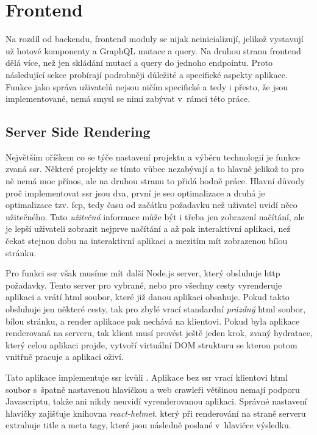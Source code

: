 \section{Frontend}
\label{sc:frontend}
Na rozdíl od backendu, frontend moduly se nijak neinicializují, jelikož vystavují už hotové komponenty a GraphQL mutace a query. Na druhou stranu frontend dělá více, než jen skládání mutací a query do jednoho endpointu. Proto následující sekce probírají podrobněji důležité a specifické aspekty aplikace. Funkce jako správa uživatelů nejsou ničím specifické a tedy i přesto, že jsou implementované, nemá smysl se nimi zabývat v~rámci této práce.

\subsection{Server Side Rendering}
\label{ss:ssr}
Největším oříškem co se týče nastavení projektu a výběru technologií je funkce zvaná \acrfull{ssr}. Některé projekty se tímto vůbec nezabývají a to hlavně jelikož to pro ně nemá moc přínos, ale na druhou stranu to přidá hodně práce. Hlavní důvody proč implementovat \acrshort{ssr} jsou dva, první je \acrshort{seo} optimalizace a druhá je optimalizace tzv. \acrfull{fcp}, tedy času od začátku požadavku než uživatel uvidí něco užitečného. Tato \emph{užitečná} informace může být i třeba jen zobrazení načítání, ale je lepší uživateli zobrazit nejprve načítání a až pak interaktivní aplikaci, než čekat stejnou dobu na interaktivní aplikaci a mezitím mít zobrazenou bílou stránku.

Pro funkci \acrshort{ssr} však musíme mít další Node.js server, který obsluhuje http požadavky. Tento server pro vybrané, nebo pro všechny cesty vyrenderuje aplikaci a vrátí html soubor, které již danou aplikaci obsahuje. Pokud takto obsluhuje jen některé cesty, tak pro zbylé vrací standardní \emph{prázdný} html soubor, bílou stránku, a render aplikace pak nechává na klientovi. Pokud byla aplikace renderovaná na serveru, tak klient musí provést ještě jeden krok, zvaný hydratace, který celou aplikaci projde, vytvoří virtuální DOM strukturu se kterou potom vnitřně pracuje a aplikaci oživí.

Tato aplikace implementuje \acrshort{ssr} kvůli . Aplikace bez \acrshort{ssr} vrací klientovi html soubor s~špatně nastavenou hlavičkou a web crawleři většinou nemají podporu Javascriptu, takže ani nikdy neuvidí vyrenderovanou aplikaci. Správné nastavení hlavičky zajišťuje knihovna \emph{react-helmet}. který při renderování na straně serveru extrahuje title a meta tagy, které jsou následně poslané v~hlavičce výsledku.

